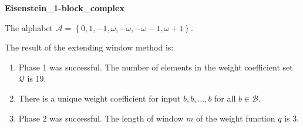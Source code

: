 \begin{exmp}
\textbf{ Eisenstein\_1-block\_complex }

\label{ex:Eisenstein1-blockcomplex}

The alphabet $\mathcal{A} =\left\{0, 1, -1, \omega, -\omega, -\omega - 1, \omega + 1\right\}$.

The result of the extending window method is:
\begin{enumerate}
    \item Phase 1 was successful.
The number of elements in the weight coefficient set $\mathcal{Q}$ is $19$.

    \item There is a unique weight coefficient for input $b,b,\dots,b$ for all $b\in\mathcal{B}$.

    \item Phase 2 was successful.
The length of window $m$ of the weight function $q$ is 3.
\end{enumerate}
\end{exmp}
